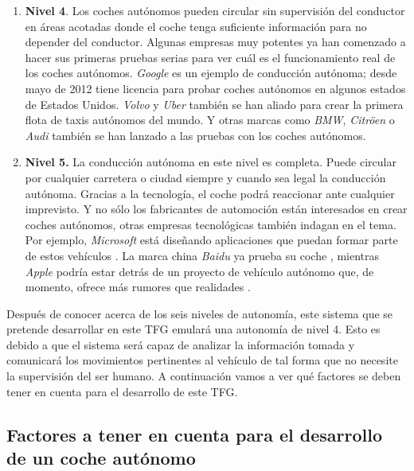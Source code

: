 \begin{enumerate}
\item \textbf{Nivel 4}. Los coches autónomos pueden circular sin supervisión del conductor en áreas acotadas donde el coche tenga suficiente información para no depender del conductor. Algunas empresas muy potentes ya han comenzado a hacer sus primeras pruebas serias para ver cuál es el funcionamiento real de los coches autónomos. \textit{Google} es un ejemplo de conducción autónoma; desde mayo de 2012 tiene licencia para probar coches autónomos en algunos estados de Estados Unidos. \textit{Volvo} y \textit{Uber} también se han aliado para crear la primera flota de taxis autónomos del mundo. Y otras marcas como \textit{BMW}, \textit{Citröen} o \textit{Audi} también se han lanzado a las pruebas con los coches autónomos.
\item \textbf{Nivel 5.} La conducción autónoma en este nivel es completa. Puede circular por cualquier carretera o ciudad siempre y cuando sea legal la conducción autónoma. Gracias a la tecnología, el coche podrá reaccionar ante cualquier imprevisto. Y no sólo los fabricantes de automoción están interesados en crear coches autónomos, otras empresas tecnológicas también indagan en el tema. Por ejemplo, \textit{Microsoft} está diseñando aplicaciones que puedan formar parte de estos vehículos \cite{Microsoft}. La marca china \textit{Baidu} ya prueba su coche \cite{Baidu}, mientras \textit{Apple} podría estar detrás de un proyecto de vehículo autónomo que, de momento, ofrece más rumores que realidades \cite{Apple}.
\end{enumerate}

Después de conocer acerca de los seis niveles de autonomía, este sistema que se pretende desarrollar en este \ac{TFG} emulará una autonomía de nivel 4. Esto es debido a que el sistema será capaz de analizar la información tomada y comunicará los movimientos pertinentes al vehículo de tal forma que no necesite la supervisión del ser humano. A continuación vamos a ver qué factores se deben tener en cuenta para el desarrollo de este \ac{TFG}.

\subsection{Factores a tener en cuenta para el desarrollo de un coche autónomo}

